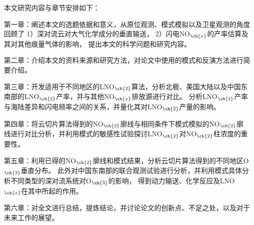 本文研究内容与章节安排如下：

第一章：阐述本文的选题依据和意义，从原位观测、模式模拟以及卫星观测的角度回顾了
1）深对流云对大气化学成分的垂直输送，
2）闪电NO$_{\ch{x}}$的产率估算及其对其他痕量气体的影响，
提出本文的科学问题和研究内容。

第二章：介绍本文的资料来源和研究方法，对论文中使用的模式和反演方法进行简要介绍。

第三章：开发适用于不同地区的LNO$_{\ch{2}}$算法，分析北极、美国大陆以及中国东南部的LNO$_{\ch{2}}$产率，并与其他NO$_{\ch{x}}$排放源进行对比。
分析LNO$_{\ch{2}}$产率与海陆差异和闪电频率之间的关系，并量化其对LNO$_{\ch{2}}$产量的影响。

第四章：将云切片算法得到的NO$_{\ch{2}}$廓线与相同条件下模式模拟的NO$_{\ch{2}}$廓线进行对比分析，并利用模式的敏感性试验探讨LNO$_{\ch{2}}$对NO$_{\ch{2}}$柱浓度的重要性。

第五章：利用已得的NO$_{\ch{2}}$廓线和模式结果，分析云切片算法得到的不同地区O$_{\ch{3}}$垂直分布。
此外对中国东南部的联合观测试验进行分析，并利用模式具体分析不同类型的深对流系统对O$_{\ch{3}}$的影响，
得到动力输送、化学反应及LNO$_{\ch{x}}$在其中所起的作用。

第六章：对全文进行总结，提炼结论，并讨论论文的创新点、不足之处，以及对于未来工作的展望。
